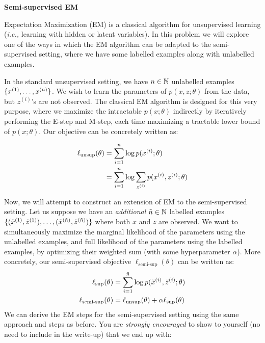 \item {} {\bf Semi-supervised EM}

\def\zsi{z^{(i)}}
\def\xsi{x^{(i)}}

Expectation Maximization (EM) is a classical algorithm for unsupervised learning (\emph{i.e.,} learning with hidden or latent variables). In this problem we will explore one of the ways in which the EM algorithm can be adapted to the semi-supervised setting, where we have some labelled examples along with unlabelled examples.

In the standard unsupervised setting, we have ${n} \in \mathbb{N}$ unlabelled examples $\{x^{(1)},\ldots,x^{({n})}\}$. We wish to learn the parameters of $p(x,z;\theta)$ from the data, but $\zsi$'s are not observed. The classical EM algorithm is designed for this very purpose, where we maximize the intractable $p(x;\theta)$ indirectly by iteratively performing the E-step and M-step, each time maximizing a tractable lower bound of $p(x;\theta)$. Our objective can be concretely written as:

\begin{align*}
    \ell_{\text{unsup}}(\theta) &= \sum_{i=1}^\nexp \log p(\xsi;\theta) \\
    &= \sum_{i=1}^\nexp \log \sum_{\zsi} p(\xsi,\zsi;\theta)
\end{align*}


Now, we will attempt to construct an extension of EM to the semi-supervised setting. Let us suppose we have an \emph{additional} $\tilde{{n}} \in \mathbb{N}$ labelled examples $\{(\tilde{x}^{(1)},\tilde{z}^{(1)}),\ldots,(\tilde{x}^{(\tilde{{n}})},\tilde{z}^{(\tilde{{n}})})\}$ where both $x$ and $z$ are observed. We want to simultaneously maximize the marginal likelihood of the parameters using the unlabelled examples, and full likelihood of the parameters using the labelled examples, by optimizing their weighted sum (with some hyperparameter $\alpha$). More concretely, our semi-supervised objective $\ell_\text{semi-sup}(\theta)$ can be written as:
%
\begin{align*}
    \ell_\text{sup}(\theta) &= \sum_{i=1}^{\tilde{{n}}} \log p(\tilde{x}^{(i)},\tilde{z}^{(i)};\theta) \\
    \ell_{\text{semi-sup}}(\theta) &= \ell_\text{unsup}(\theta) + \alpha \ell_\text{sup}(\theta)
\end{align*}
%
We can derive the EM steps for the semi-supervised setting using the same approach and steps as before. You are \emph{strongly encouraged} to show to yourself (no need to include in the write-up) that we end up with:

